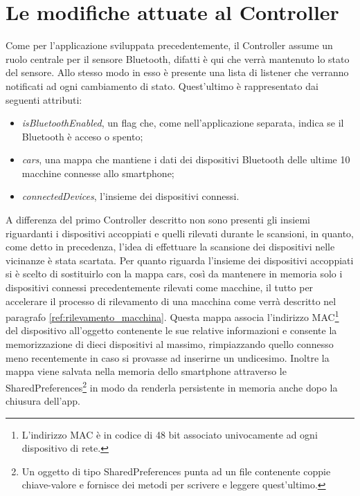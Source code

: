 \section{Le modifiche attuate al Controller}
Come per l'applicazione sviluppata precedentemente, il Controller assume un ruolo centrale per il sensore Bluetooth, difatti è qui che verrà mantenuto lo stato del sensore. Allo stesso modo in esso è presente una lista di listener che verranno notificati ad ogni cambiamento di stato. Quest'ultimo è rappresentato dai seguenti attributi:
\begin{itemize}
    \item \textit{isBluetoothEnabled}, un flag che, come nell'applicazione separata, indica se il Bluetooth è acceso o spento;
    \item \textit{cars}, una mappa che mantiene i dati dei dispositivi Bluetooth delle ultime 10 macchine connesse allo smartphone;
    \item \textit{connectedDevices}, l'insieme dei dispositivi connessi.
\end{itemize}
A differenza del primo Controller descritto non sono presenti gli insiemi riguardanti i dispositivi accoppiati e quelli rilevati durante le scansioni, in quanto, come detto in precedenza, l'idea di effettuare la scansione dei dispositivi nelle vicinanze è stata scartata. Per quanto riguarda l'insieme dei dispositivi accoppiati si è scelto di sostituirlo con la mappa cars, così da mantenere in memoria solo i dispositivi connessi precedentemente rilevati come macchine, il tutto per accelerare il processo di rilevamento di una macchina come verrà descritto nel paragrafo \ref{ref:rilevamento_macchina}. Questa mappa associa l'indirizzo MAC\footnote{L'indirizzo MAC è in codice di 48 bit associato univocamente ad ogni dispositivo di rete.} del dispositivo all'oggetto contenente le sue relative informazioni e consente la memorizzazione di dieci dispositivi al massimo, rimpiazzando quello connesso meno recentemente in caso si provasse ad inserirne un undicesimo. Inoltre la mappa viene salvata nella memoria dello smartphone attraverso le SharedPreferences\footnote{Un oggetto di tipo SharedPreferences punta ad un file contenente coppie chiave-valore e fornisce dei metodi per scrivere e leggere quest'ultimo.} in modo da renderla persistente in memoria anche dopo la chiusura dell'app.

